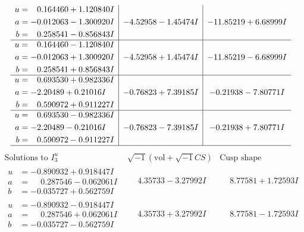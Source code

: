 \documentclass[1p]{elsarticle_modified}
\theoremstyle{definition}
\newcommand{\I}{\sqrt{-1}}
\begin{document}
$$\begin{array}{c|c|c}
\begin{aligned}
u &= \phantom{-}0.164460 + 1.120840 I \\
a &= -0.012063 - 1.300920 I \\
b &= \phantom{-}0.258541 - 0.856843 I\end{aligned}
 & -4.52958 - 1.45474 I & -11.85219 + 6.68999 I \\ \hline\begin{aligned}
u &= \phantom{-}0.164460 - 1.120840 I \\
a &= -0.012063 + 1.300920 I \\
b &= \phantom{-}0.258541 + 0.856843 I\end{aligned}
 & -4.52958 + 1.45474 I & -11.85219 - 6.68999 I \\ \hline\begin{aligned}
u &= \phantom{-}0.693530 + 0.982336 I \\
a &= -2.20489 + 0.21016 I \\
b &= \phantom{-}0.590972 + 0.911227 I\end{aligned}
 & -0.76823 + 7.39185 I & -0.21938 - 7.80771 I \\ \hline\begin{aligned}
u &= \phantom{-}0.693530 - 0.982336 I \\
a &= -2.20489 - 0.21016 I \\
b &= \phantom{-}0.590972 - 0.911227 I\end{aligned}
 & -0.76823 - 7.39185 I & -0.21938 + 7.80771 I\\
 \hline 
 \end{array}$$\newpage$$\begin{array}{c|c|c}  
\text{Solutions to }I^u_{3}& \I (\text{vol} + \sqrt{-1}CS) & \text{Cusp shape}\\
 \hline 
\begin{aligned}
u &= -0.890932 + 0.918447 I \\
a &= \phantom{-}0.287546 - 0.062061 I \\
b &= -0.035727 + 0.562759 I\end{aligned}
 & \phantom{-}4.35733 - 3.27992 I & \phantom{-}8.77581 + 1.72593 I \\ \hline\begin{aligned}
u &= -0.890932 - 0.918447 I \\
a &= \phantom{-}0.287546 + 0.062061 I \\
b &= -0.035727 - 0.562759 I\end{aligned}
 & \phantom{-}4.35733 + 3.27992 I & \phantom{-}8.77581 - 1.72593 I \\ \hline\begin{aligned}

\end{aligned}
\end{array}$$
\end{document}
